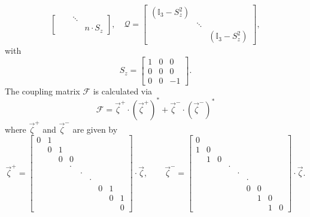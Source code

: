 \begin{bibunit}
\begin{equation}
\begin{bmatrix}
    && \ddots & \\
    & & & n\cdot S_z
  \end{bmatrix},\quad
  \mathcal{Q} =
  \begin{bmatrix}
    (\mathbb{I}_3 -S_z^2) &  \\
    & \ddots & \\
    & & (\mathbb{I}_3 -S_z^2)
  \end{bmatrix},
\end{equation}
with
\begin{equation}
    S_z = \begin{bmatrix}
      1&0&0\\
      0&0&0\\
      0&0&-1
    \end{bmatrix}.
\end{equation}
The coupling matrix $\mathcal{F}$ is calculated via
\begin{equation}
    \mathcal F = \vec{\zeta}^+\cdot(\vec{\zeta}^+)^* + \vec{\zeta}^-\cdot(\vec{\zeta}^-)^*
\end{equation}
where $\vec{\zeta}^+$ and $\vec{\zeta}^-$ are given by 
\begin{equation}
    \vec{\zeta}^+ = \begin{bmatrix}
    0 & 1 &&&&&&\\
    & 0 & 1 &&&&&&\\
    && 0 & 0 &&&&&\\
    &&& \cdot &&&&&\\
    &&&& \cdot &&&&\\
    &&&&& \cdot &&&\\
    &&&&&& 0 & 1 &\\
    &&&&&&& 0 & 1\\
    &&&&&&&& 0
  \end{bmatrix}\cdot\vec{\zeta}
  ,\qquad
  \vec{\zeta}^- = \begin{bmatrix}
    0 &&&&&&&\\
    1 & 0 &&&&&&&\\
    & 1 & 0 &&&&&&\\
    &&& \cdot &&&&&\\
    &&&& \cdot &&&&\\
    &&&&& \cdot &&&\\
    &&&&& 0 & 0 &&\\
    &&&&&& 1 & 0 &\\
    &&&&&&& 1 & 0
    \end{bmatrix}\cdot\vec{\zeta}.
\end{equation}


\end{bibunit}
